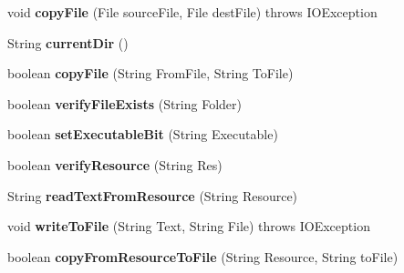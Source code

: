 \begin{DoxyCompactItemize}
\item 
\hypertarget{classCASUAL_1_1FileOperations_a95b6013a6610a12798b5a245a741196a}{void {\bfseries copy\-File} (File source\-File, File dest\-File)  throws I\-O\-Exception }\label{classCASUAL_1_1FileOperations_a95b6013a6610a12798b5a245a741196a}

\item 
\hypertarget{classCASUAL_1_1FileOperations_a6218a9a8ce1c18711d59b844417adc8a}{String {\bfseries current\-Dir} ()}\label{classCASUAL_1_1FileOperations_a6218a9a8ce1c18711d59b844417adc8a}

\item 
\hypertarget{classCASUAL_1_1FileOperations_a13967d313b6bd64f4449872f39cd9850}{boolean {\bfseries copy\-File} (String From\-File, String To\-File)}\label{classCASUAL_1_1FileOperations_a13967d313b6bd64f4449872f39cd9850}

\item 
\hypertarget{classCASUAL_1_1FileOperations_a4c17ab8b3acd4d14bebfce16072ee88b}{boolean {\bfseries verify\-File\-Exists} (String Folder)}\label{classCASUAL_1_1FileOperations_a4c17ab8b3acd4d14bebfce16072ee88b}

\item 
\hypertarget{classCASUAL_1_1FileOperations_ad065441f27945626464c5ea2a5b1e453}{boolean {\bfseries set\-Executable\-Bit} (String Executable)}\label{classCASUAL_1_1FileOperations_ad065441f27945626464c5ea2a5b1e453}

\item 
\hypertarget{classCASUAL_1_1FileOperations_aeeab03412b9e7ae3ee245798e1e1b3d8}{boolean {\bfseries verify\-Resource} (String Res)}\label{classCASUAL_1_1FileOperations_aeeab03412b9e7ae3ee245798e1e1b3d8}

\item 
\hypertarget{classCASUAL_1_1FileOperations_af56078757baad2c1f1ce56bbe88ed583}{String {\bfseries read\-Text\-From\-Resource} (String Resource)}\label{classCASUAL_1_1FileOperations_af56078757baad2c1f1ce56bbe88ed583}

\item 
\hypertarget{classCASUAL_1_1FileOperations_a71fbad8531341fe6c2c5212aac13349d}{void {\bfseries write\-To\-File} (String Text, String File)  throws I\-O\-Exception}\label{classCASUAL_1_1FileOperations_a71fbad8531341fe6c2c5212aac13349d}

\item 
\hypertarget{classCASUAL_1_1FileOperations_a4e114f0c6001493ca5ed892e59276420}{boolean {\bfseries copy\-From\-Resource\-To\-File} (String Resource, String to\-File)}\label{classCASUAL_1_1FileOperations_a4e114f0c6001493ca5ed892e59276420}


\end{DoxyCompactItemize}
